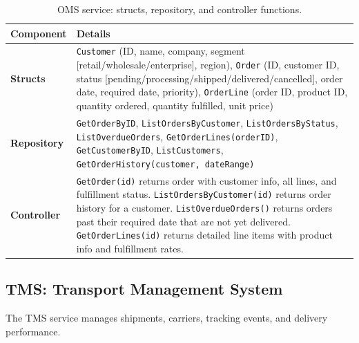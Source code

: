 \documentclass[12pt,a4paper]{report}
\begin{document}
\begin{table}[H]
\centering\small
\caption{OMS service: structs, repository, and controller functions.}
\begin{tabularx}{\textwidth}{@{} l X @{}}
\toprule
\textbf{Component} & \textbf{Details} \\
\midrule
\textbf{Structs} &
    \texttt{Customer} (ID, name, company, segment [retail/wholesale/enterprise], region),
    \texttt{Order} (ID, customer ID, status [pending/processing/shipped/delivered/cancelled], order date, required date, priority),
    \texttt{OrderLine} (order ID, product ID, quantity ordered, quantity fulfilled, unit price) \\
\textbf{Repository} &
    \texttt{GetOrderByID}, \texttt{ListOrdersByCustomer}, \texttt{ListOrdersByStatus},
    \texttt{ListOverdueOrders}, \texttt{GetOrderLines(orderID)},
    \texttt{GetCustomerByID}, \texttt{ListCustomers},
    \texttt{GetOrderHistory(customer, dateRange)} \\
\textbf{Controller} &
    \texttt{GetOrder(id)} returns order with customer info, all lines, and fulfillment status.
    \texttt{ListOrdersByCustomer(id)} returns order history for a customer.
    \texttt{ListOverdueOrders()} returns orders past their required date that are not yet delivered.
    \texttt{GetOrderLines(id)} returns detailed line items with product info and fulfillment rates. \\
\bottomrule
\end{tabularx}
\end{table}

\subsection{TMS: Transport Management System}

The TMS service manages shipments, carriers, tracking events, and delivery performance.
\end{document}

